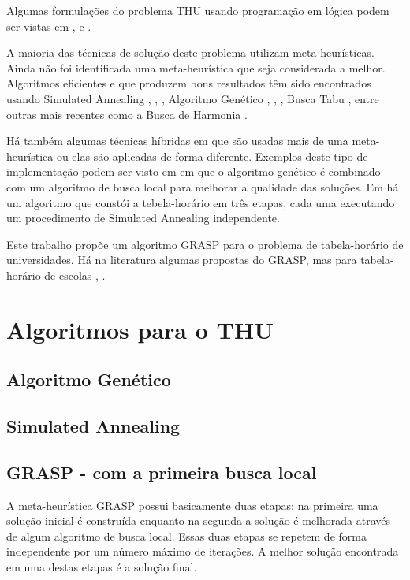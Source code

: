 \documentclass[11pt]{article}
\begin{document}
Algumas formulações do problema THU usando programação em lógica podem ser vistas em \cite{Gueret95buildinguniversity}, \cite{Goltz99universitytimetabling} e \cite{springerlink:10.1007/s10479-012-1081-x}.

A maioria das técnicas de solução deste problema utilizam meta-heurísticas. Ainda não foi identificada uma meta-heurística que seja considerada a melhor.  Algoritmos eficientes e que produzem bons resultados têm sido encontrados usando Simulated Annealing \cite{3-phaseSA}, \cite{sa_hyper_heuristica}, \cite{Elmohamed98acomparison}, Algoritmo Genético \cite{Erben95agenetic}, \cite{suyanto}, \cite{Kanoh:2008:KGA:1460198.1460201}, Busca Tabu \cite{elloumi2008}, entre outras mais recentes como a Busca de Harmonia \cite{albetar_harmony}.

Há também algumas técnicas híbridas em que são usadas mais de uma meta-heurística ou elas são aplicadas de forma diferente. Exemplos deste tipo de implementação podem ser visto em \cite{massoodian2008} em que o algoritmo genético é combinado com um algoritmo de busca local para melhorar a qualidade das soluções. Em \cite{3-phaseSA} há um algoritmo que constói a tebela-horário em três etapas, cada uma executando um procedimento de Simulated Annealing independente.

Este trabalho propõe um algoritmo GRASP para o problema de tabela-horário de universidades. Há na literatura algumas propostas do GRASP, mas para tabela-horário de escolas \cite{Souza:2004}, \cite{Vieira_agrasp}.



\section{Algoritmos para o THU}

\subsection{Algoritmo Genético}

\subsection{Simulated Annealing}

\subsection{GRASP - com a primeira busca local}

A meta-heurística GRASP \cite{grasp_resende_ribeiro} possui basicamente duas etapas: na primeira uma solução inicial é construída enquanto na segunda a solução é melhorada através de algum algoritmo de busca local. Essas duas etapas se repetem de forma independente por um número máximo de iterações. A melhor solução encontrada em uma destas etapas é a solução final.
\end{document}
